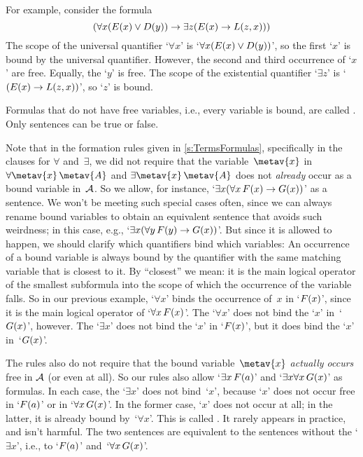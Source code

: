 
        
For example, consider the formula
	$$(\forall x(E(x) \vee D(y)) \rightarrow \exists z(E(x) \rightarrow L(z,x)))$$
The scope of the universal quantifier `$\forall x$' is `$\forall x (E(x) \vee D(y))$', so the first `$x$' is bound by the universal quantifier. However, the second and third occurrence of `$x$' are free. Equally, the `$y$' is free. The scope of the existential quantifier `$\exists z$' is `$(E(x) \rightarrow L(z,x))$', so `$z$' is bound.

Formulas that do not have free variables, i.e., every variable is
bound, are called . Only sentences can be true or false.


Note that in the formation rules given in \cref{s:TermsFormulas},
specifically in the clauses for $\forall$ and~$\exists$, we did not
require that the variable~$\metav{x}$ in $\forall\metav{x}\,
\metav{A}$ and $\exists\metav{x}\,\metav{A}$ does not \emph{already}
occur as a bound variable in~$\mathcal{A}$. So we allow, for instance,
`$\exists x(\forall x\,F(x) \rightarrow G(x))$' as a sentence. We
won't be meeting such special cases often, since we can always rename
bound variables to obtain an equivalent sentence that avoids such
weirdness; in this case, e.g., `$\exists x(\forall y\,F(y) \rightarrow
G(x))$'. But since it is allowed to happen, we should clarify
which quantifiers bind which variables: An occurrence of a bound
variable is always bound by the quantifier with the same matching
variable that is closest to it. By ``closest'' we mean: it is the main
logical operator of the smallest subformula into the scope of which
the occurrence of the variable falls. So in our previous example,
`$\forall x$' binds the occurrence of~$x$ in `$F(x)$', since it is
the main logical operator of `$\forall x\,F(x)$'. The `$\forall x$'
does not bind the `$x$' in~`$G(x)$', however. The `$\exists x$' does
not bind the `$x$' in `$F(x)$', but it does bind the `$x$'
in~`$G(x)$'.

The rules also do not require that the bound variable~$\metav{x}$
\emph{actually occurs} free in $\mathcal{A}$ (or even at all). So our
rules also allow `$\exists x\,F(a)$' and `$\exists x\forall
x\,G(x)$' as formulas. In each case, the `$\exists x$' does not
bind~`$x$', because `$x$' does not occur free in `$F(a)$' or in
`$\forall x\,G(x)$'. In the former case, `$x$' does not occur at
all; in the latter, it is already bound by~`$\forall x$'. This is called
. It rarely appears in practice, and
isn't harmful. The two sentences are equivalent to the sentences
without the `$\exists x$', i.e., to `$F(a)$' and~`$\forall
x\,G(x)$'.

